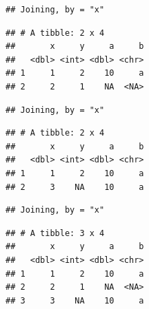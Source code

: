 \documentclass[]{book}
\newenvironment{Shaded}{\begin{snugshade}}{\end{snugshade}}
\newcommand{\KeywordTok}[1]{\textcolor[rgb]{0.13,0.29,0.53}{\textbf{#1}}}
\newcommand{\DataTypeTok}[1]{\textcolor[rgb]{0.13,0.29,0.53}{#1}}
\newcommand{\StringTok}[1]{\textcolor[rgb]{0.31,0.60,0.02}{#1}}
\newcommand{\CommentTok}[1]{\textcolor[rgb]{0.56,0.35,0.01}{\textit{#1}}}
\newcommand{\OperatorTok}[1]{\textcolor[rgb]{0.81,0.36,0.00}{\textbf{#1}}}
\newcommand{\NormalTok}[1]{#1}
\theoremstyle{definition}
\theoremstyle{definition}
\theoremstyle{definition}
\theoremstyle{remark}
\begin{document}
\begin{verbatim}
## Joining, by = "x"
\end{verbatim}

\begin{verbatim}
## # A tibble: 2 x 4
##       x     y     a     b
##   <dbl> <int> <dbl> <chr>
## 1     1     2    10     a
## 2     2     1    NA  <NA>
\end{verbatim}

\begin{Shaded}
\end{Shaded}

\begin{verbatim}
## Joining, by = "x"
\end{verbatim}

\begin{verbatim}
## # A tibble: 2 x 4
##       x     y     a     b
##   <dbl> <int> <dbl> <chr>
## 1     1     2    10     a
## 2     3    NA    10     a
\end{verbatim}

\begin{Shaded}
\end{Shaded}

\begin{verbatim}
## Joining, by = "x"
\end{verbatim}

\begin{verbatim}
## # A tibble: 3 x 4
##       x     y     a     b
##   <dbl> <int> <dbl> <chr>
## 1     1     2    10     a
## 2     2     1    NA  <NA>
## 3     3    NA    10     a
\end{verbatim}

\begin{Shaded}
\end{Shaded}
\end{document}
